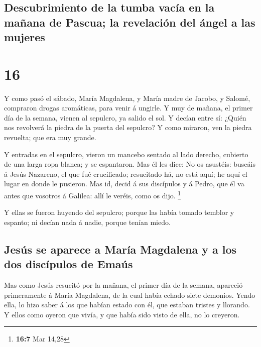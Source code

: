 \hypertarget{descubrimiento-de-la-tumba-vacuxeda-en-la-mauxf1ana-de-pascua-la-revelaciuxf3n-del-uxe1ngel-a-las-mujeres}{%
\subsection{Descubrimiento de la tumba vacía en la mañana de Pascua; la
revelación del ángel a las
mujeres}\label{descubrimiento-de-la-tumba-vacuxeda-en-la-mauxf1ana-de-pascua-la-revelaciuxf3n-del-uxe1ngel-a-las-mujeres}}

\hypertarget{section-15}{%
\section{16}\label{section-15}}

 Y como pasó el sábado, María Magdalena, y María madre de
Jacobo, y Salomé, compraron drogas aromáticas, para venir á ungirle.
 Y muy de mañana, el primer día de la semana, vienen al
sepulcro, ya salido el sol.  Y decían entre sí: ¿Quién nos
revolverá la piedra de la puerta del sepulcro?  Y como
miraron, ven la piedra revuelta; que era muy grande.

 Y entradas en el sepulcro, vieron un mancebo sentado al
lado derecho, cubierto de una larga ropa blanca; y se espantaron.
 Mas él les dice: No os asustéis: buscáis á Jesús
Nazareno, el que fué crucificado; resucitado há, no está aquí; he aquí
el lugar en donde le pusieron.  Mas id, decid á sus
discípulos y á Pedro, que él va antes que vosotros á Galilea: allí le
veréis, como os dijo. \footnote{\textbf{16:7} Mar 14,28}

 Y ellas se fueron huyendo del sepulcro; porque las había
tomado temblor y espanto; ni decían nada á nadie, porque tenían miedo.

\hypertarget{jesuxfas-se-aparece-a-maruxeda-magdalena-y-a-los-dos-discuxedpulos-de-emauxfas}{%
\subsection{Jesús se aparece a María Magdalena y a los dos discípulos de
Emaús}\label{jesuxfas-se-aparece-a-maruxeda-magdalena-y-a-los-dos-discuxedpulos-de-emauxfas}}

 Mas como Jesús resucitó por la mañana, el primer día de
la semana, apareció primeramente á María Magdalena, de la cual había
echado siete demonios.  Yendo ella, lo hizo saber á los
que habían estado con él, que estaban tristes y llorando.
 Y ellos como oyeron que vivía, y que había sido visto de
ella, no lo creyeron.


